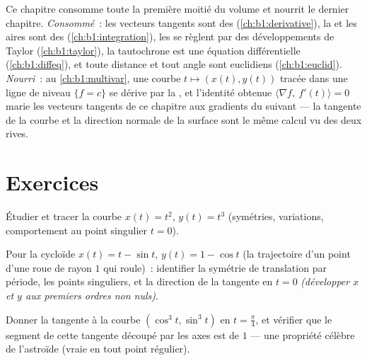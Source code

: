 \begin{remark}
\label{rem:b1:curves:perspectives}
Ce chapitre consomme toute la première moitié du volume et
nourrit le dernier chapitre. \emph{Consommé}~: les vecteurs tangents sont
des  (\cref{ch:b1:derivative}), la  et les aires sont
des  (\cref{ch:b1:integration}), les  se règlent par
des développements de Taylor (\cref{ch:b1:taylor}), la tautochrone est une
équation différentielle  (\cref{ch:b1:diffeq}), et toute
distance et tout angle sont euclidiens (\cref{ch:b1:euclid}).
\emph{Nourri}~: au \cref{ch:b1:multivar}, une courbe $t \mapsto (x(t),
y(t))$ tracée dans une ligne de niveau $\{f = c\}$ se dérive par
la , et l'identité obtenue $\langle \nabla f,\
f'(t)\rangle = 0$ marie les vecteurs tangents de ce chapitre aux
gradients du suivant --- la tangente de la courbe et la
direction normale de la surface sont le même calcul vu
des deux rives.
\end{remark}

\section{Exercices}

\begin{exercise}[$\star$]\label{exo:b1:curves:1}
Étudier et tracer la courbe $x(t) = t^2$, $y(t) = t^3$ (symétries,
variations, comportement au point singulier $t = 0$).
\end{exercise}

\begin{exercise}[$\star$]\label{exo:b1:curves:2}
Pour la cycloïde $x(t) = t - \sin t$, $y(t) = 1 - \cos t$ (la
trajectoire d'un point d'une roue de rayon $1$ qui roule)~: identifier
la symétrie de translation par période, les points singuliers, et la
direction de la tangente en $t = 0$ \emph{(développer $x$ et $y$ aux premiers
ordres non nuls)}.
\end{exercise}

\begin{exercise}[$\star$]\label{exo:b1:curves:3}
Donner la tangente à la courbe $(\cos^3 t, \sin^3 t)$ en $t =
\frac\pi4$, et vérifier que le segment de cette tangente découpé par les
axes est de \omterm{def:b1:curves:arclength}{longueur} $1$ --- une propriété célèbre de l'astroïde
(vraie en tout point régulier).
\end{exercise}


